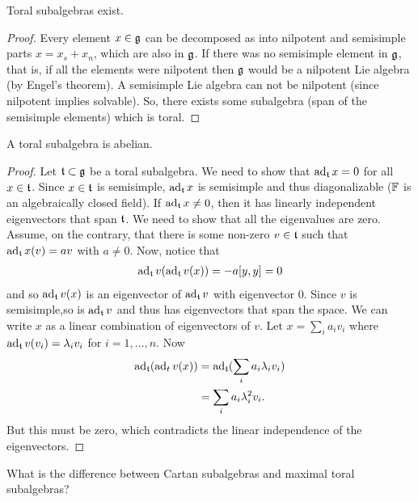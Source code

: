 \begin{lemma} 
    Toral subalgebras exist.
\end{lemma}
\begin{proof}
    Every element $x\in \mathfrak{g}$ can be decomposed as into nilpotent and semisimple parts $x=x_s + x_n$, which are also in $\mathfrak{g}$. 
    If there was no semisimple element in $\mathfrak{g}$, that is, if all the elements were nilpotent then $\mathfrak{g}$ would be a nilpotent Lie algebra (by Engel's theorem). A semisimple Lie algebra can not be nilpotent (since nilpotent implies solvable). So, there exists some subalgebra (span of the semisimple elements) which is toral.
\end{proof}

\begin{lemma}
    A toral subalgebra is abelian.
    \label{lemma:toralsubalgebra_abelian}
\end{lemma}
\begin{proof}
    Let $\Lie t \subset \Lie g$ be a toral subalgebra. We need to show that $\ad_{\Lie t} x=0 $ for all $x\in \Lie t$. Since $x\in \Lie t$ is semisimple, $\ad_\Lie t x$ is semisimple and thus diagonalizable ($\mathbb{F}$ is an algebraically closed field). If $\ad_\Lie t x \neq 0$, then it has linearly independent eigenvectors that span $\Lie t$. We need to show that all the eigenvalues are zero. Assume, on the contrary, that there is some non-zero $v\in \Lie t$ such that $\ad_\Lie t x (v)=av$ with $a\neq 0$. Now, notice that 
    \begin{align}
        \ad_\Lie t v(\ad_\Lie t v(x))=-a[y,y]=0
    \end{align} 
    and so $\ad_\Lie t v(x)$ is an eigenvector of $\ad_\Lie t v$ with eigenvector $0$. Since $v$ is semisimple,so is $\ad_\Lie t v$ and thus has eigenvectors that span the space. We can write $x$ as a linear combination of eigenvectors of $v$. Let $x=\sum_i a_i v_i$ where $\ad_\Lie t v (v_i)=\lambda_i v_i$ for $i=1,\dotsc,n$. Now
    \begin{align}
        \ad_\Lie t (\ad_t v(x))&= \ad_\Lie t (\sum_i a_i \lambda_i v_i) \\
            &= \sum_i a_i \lambda_i^2 v_i. 
    \end{align}
    But this must be zero, which contradicts the linear independence of the eigenvectors.  
\end{proof}

\begin{insight}
    What is the difference between Cartan subalgebras and maximal toral subalgebras?  
\end{insight}


